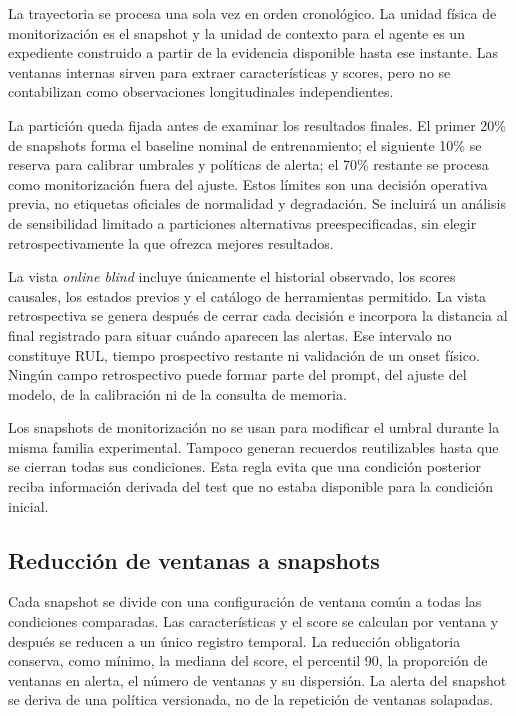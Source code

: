 La trayectoria se procesa una sola vez en orden cronológico. La unidad física
de monitorización es el snapshot y la unidad de contexto para el agente es un
expediente construido a partir de la evidencia disponible hasta ese instante.
Las ventanas internas sirven para extraer características y scores, pero no se
contabilizan como observaciones longitudinales independientes.

La partición queda fijada antes de examinar los resultados finales. El primer
20\% de snapshots forma el baseline nominal de entrenamiento; el siguiente
10\% se reserva para calibrar umbrales y políticas de alerta; el 70\% restante
se procesa como monitorización fuera del ajuste. Estos límites son una decisión
operativa previa, no etiquetas oficiales de normalidad y degradación. Se
incluirá un análisis de sensibilidad limitado a particiones alternativas
preespecificadas, sin elegir retrospectivamente la que ofrezca mejores
resultados.

La vista \textit{online blind} incluye únicamente el historial observado, los
scores causales, los estados previos y el catálogo de herramientas permitido.
La vista retrospectiva se genera después de cerrar cada decisión e incorpora
la distancia al final registrado para situar cuándo aparecen las alertas.
Ese intervalo no constituye RUL, tiempo prospectivo restante ni validación de
un onset físico. Ningún campo retrospectivo puede formar parte del prompt, del
ajuste del modelo, de la calibración ni de la consulta de memoria.

Los snapshots de monitorización no se usan para modificar el umbral durante la
misma familia experimental. Tampoco generan recuerdos reutilizables hasta que
se cierran todas sus condiciones. Esta regla evita que una condición posterior
reciba información derivada del test que no estaba disponible para la
condición inicial.

\subsection{Reducción de ventanas a snapshots}

Cada snapshot se divide con una configuración de ventana común a todas las
condiciones comparadas. Las características y el score se calculan por ventana
y después se reducen a un único registro temporal. La reducción obligatoria
conserva, como mínimo, la mediana del score, el percentil 90, la proporción de
ventanas en alerta, el número de ventanas y su dispersión. La alerta del
snapshot se deriva de una política versionada, no de la repetición de ventanas
solapadas.

